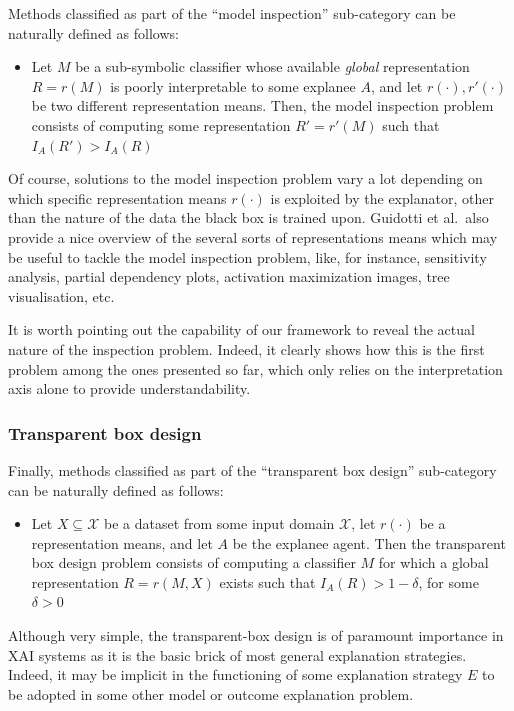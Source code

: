 \documentclass[12pt,a4paper,openright,twoside]{book}
\begin{document}
Methods classified as part of the ``model inspection'' sub-category can be naturally defined as follows:
%
\begin{itemize}
    \item[] Let $M$ be a sub-symbolic classifier whose available \emph{global} representation $R = r(M)$ is poorly interpretable to some explanee $A$, and let $r(\cdot), r'(\cdot)$ be two different representation means.
    Then, the model inspection problem consists of computing some representation $R' = r'(M)$ such that $I_A(R') > I_A(R)$
\end{itemize}
%
Of course, solutions to the model inspection problem vary a lot depending on which specific representation means $r(\cdot)$ is exploited by the explanator, other than the nature of the data the black box is trained upon.
%
Guidotti et al.\ also provide a nice overview of the several sorts of representations means which may be useful to tackle the model inspection problem, like, for instance, sensitivity analysis, partial dependency plots, activation maximization images, tree visualisation, etc.

It is worth pointing out the capability of our framework to reveal the actual nature of the inspection problem.
%
Indeed, it clearly shows how this is the first problem among the ones presented so far, which only relies on the interpretation axis alone to provide understandability.

\subsubsection{Transparent box design}

Finally, methods classified as part of the ``transparent box design'' sub-category can be naturally defined as follows:
%
\begin{itemize}
    \item[] Let $X \subseteq \mathcal{X}$ be a dataset from some input domain $\mathcal{X}$, let $r(\cdot)$ be a representation means, and let $A$ be the explanee agent.
    Then the transparent box design problem consists of computing a classifier $M$ for which a global representation $R = r(M, X)$ exists such that $I_A(R) > 1 - \delta$, for some $\delta > 0$
\end{itemize}
%
Although very simple, the transparent-box design is of paramount importance in XAI systems as it is the basic brick of most general explanation strategies.
%
Indeed, it may be implicit in the functioning of some explanation strategy $E$ to be adopted in some other model or outcome explanation problem.
\end{document}
